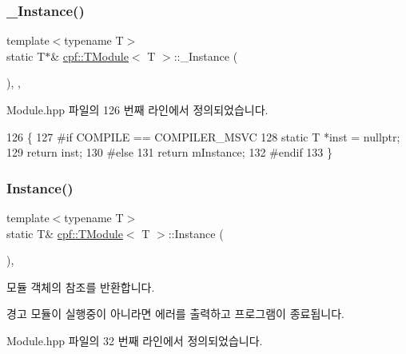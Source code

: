 \subsubsection{\texorpdfstring{\+\_\+\+Instance()}{\_Instance()}}
{\footnotesize\ttfamily template$<$typename T$>$ \\
static T$\ast$\& \hyperlink{classcpf_1_1_t_module}{cpf\+::\+T\+Module}$<$ T $>$\+::\+\_\+\+Instance (\begin{DoxyParamCaption}{ }\end{DoxyParamCaption})\hspace{0.3cm}{\ttfamily [inline]}, {\ttfamily [static]}, {\ttfamily [private]}}



Module.\+hpp 파일의 126 번째 라인에서 정의되었습니다.


\begin{DoxyCode}
126                                \{
127 \textcolor{preprocessor}{#if COMPILE == COMPILER\_MSVC}
128             \textcolor{keyword}{static} T *inst = \textcolor{keyword}{nullptr};
129             \textcolor{keywordflow}{return} inst;
130 \textcolor{preprocessor}{#else }
131             \textcolor{keywordflow}{return} mInstance;
132 \textcolor{preprocessor}{#endif}
133         \}
\end{DoxyCode}
\mbox{\label{classcpf_1_1_t_module_ac8065254584cb0a6656c42f96859d190}} 
\subsubsection{\texorpdfstring{Instance()}{Instance()}}
{\footnotesize\ttfamily template$<$typename T$>$ \\
static T\& \hyperlink{classcpf_1_1_t_module}{cpf\+::\+T\+Module}$<$ T $>$\+::Instance (\begin{DoxyParamCaption}{ }\end{DoxyParamCaption})\hspace{0.3cm}{\ttfamily [inline]}, {\ttfamily [static]}}

모듈 객체의 참조를 반환합니다. \begin{DoxyWarning}{경고}
모듈이 실행중이 아니라면 에러를 출력하고 프로그램이 종료됩니다. 
\end{DoxyWarning}


Module.\+hpp 파일의 32 번째 라인에서 정의되었습니다.


